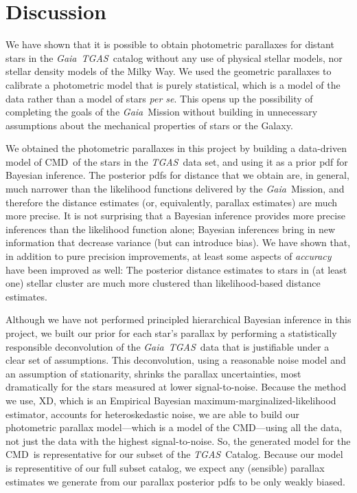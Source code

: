 \documentclass[modern]{aastex61}
\newcommand{\foreign}[1]{\textsl{#1}}
\newcommand{\acronym}[1]{{\small{#1}}}
\newcommand{\project}[1]{\textsl{#1}}
\newcommand{\tgas}{\project{\acronym{TGAS}}}
\newcommand{\gaia}{\project{Gaia}}
\newcommand{\xd}{\acronym{XD}}
\newcommand{\cmd}{\acronym{CMD}}
\begin{document}
\section{Discussion}

We have shown that it is possible to obtain photometric parallaxes for
distant stars in the \gaia\ \tgas\ catalog without any use of physical stellar
models, nor stellar density models of the Milky Way.
We used the geometric parallaxes to calibrate a photometric
model that is purely statistical, which is a model of the data rather than
a model of stars \foreign{per se}.
This opens up the possibility of completing the goals of the \gaia\ Mission
without building in unnecessary assumptions about the mechanical properties
of stars or the Galaxy.

We obtained the photometric parallaxes in this project
by building a data-driven model of \cmd\ of the stars in the \tgas\ data set,
and using it as a prior pdf for Bayesian inference.
The posterior pdfs for distance that we obtain are, in general, much
narrower than the likelihood functions delivered by the
\gaia\ Mission, and therefore the distance estimates (or,
equivalently, parallax estimates) are much more precise.
It is not surprising that a Bayesian inference provides more
precise inferences than the likelihood function alone; Bayesian
inferences bring in new information that decrease variance (but
can introduce bias).
We have shown that, in addition to pure precision improvements, at
least some aspects of \emph{accuracy} have been improved as well:
The posterior distance estimates to stars in (at least one) stellar
cluster are much more clustered than likelihood-based distance
estimates.

Although we have not performed principled hierarchical Bayesian inference in this
project, we built our prior for each star's parallax by
performing a statistically responsible deconvolution
of the \gaia\ \tgas\ data that is justifiable under a clear set of
assumptions.
This deconvolution, using a reasonable noise model and an
assumption of stationarity, shrinks the parallax uncertainties, most dramatically for the stars measured at lower signal-to-noise.
Because the method we use, \xd, which is
an Empirical Bayesian maximum-marginalized-likelihood estimator, accounts for
heteroskedastic noise, we are able to build our photometric parallax
model---which is a model of the \cmd---using
all the data, not just the data with the highest signal-to-noise.
So, the generated model for the \cmd\ is representative for
our subset of the \tgas\ Catalog.
Because our model is representitive of our full subset catalog, we expect any (sensible) parallax estimates
we generate from our parallax posterior pdfs to be only weakly biased.
\end{document}
